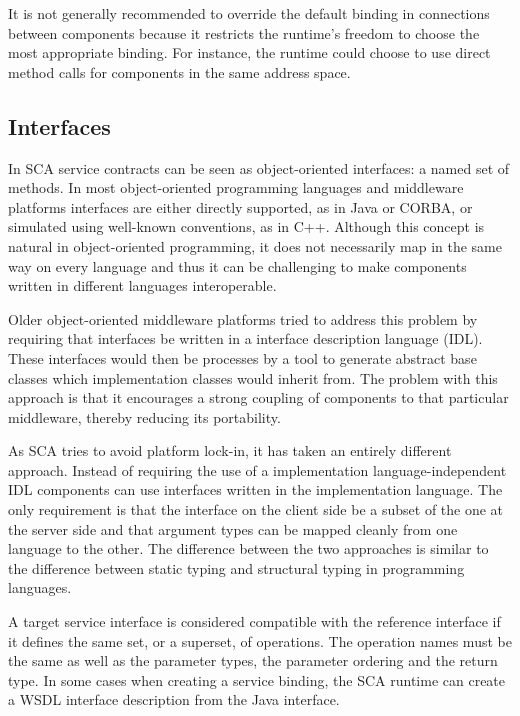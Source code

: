 It is not generally recommended to override the default binding in connections between components because it restricts
the runtime's freedom to choose the most appropriate binding. For instance, the runtime could choose to use direct method
calls for components in the same address space.

\subsection{Interfaces}
In SCA service contracts can be seen as object-oriented interfaces: a named set of methods. In most object-oriented programming
languages and middleware platforms interfaces are either directly supported, as in Java or CORBA, or simulated using well-known
conventions, as in C++. Although this concept is natural in object-oriented programming, it does not necessarily map in the same
way on every language and thus it can be challenging to make components written in different languages interoperable.

Older object-oriented middleware platforms tried to address this problem by requiring that interfaces be written in a
interface description language (IDL). These interfaces would then be processes by a tool to generate abstract base classes
which implementation classes would inherit from. The problem with this approach is that it encourages a strong coupling
of components to that particular middleware, thereby reducing its portability.

As SCA tries to avoid platform lock-in, it has taken an entirely different approach. Instead of requiring the use
of a implementation language-independent IDL components can use interfaces written in the implementation language.
The only requirement is that the interface on the client side be a subset of the one at the server side and that
argument types can be mapped cleanly from one language to the other. The difference between the two approaches is
similar to the difference between static typing and structural typing in programming languages.

A target service interface is considered compatible with the reference interface if it defines the same set, or a superset,
of operations. The operation names must be the same as well as the parameter types, the parameter ordering and the return
type.
In some cases 
when creating a service binding, the SCA runtime can create a WSDL interface description from the Java interface.



